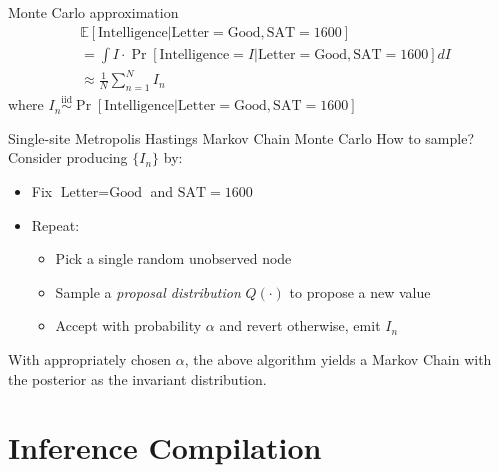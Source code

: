\documentclass{beamer}
\begin{document}
\begin{frame}[fragile]{Monte Carlo approximation}
\begin{align*}
    &\mathbb{E}[\text{Intelligence} | \text{Letter}=\text{Good}, \text{SAT}=1600] \\
    &= \int I \cdot \Pr[\text{Intelligence}=I | \text{Letter}=\text{Good}, \text{SAT}=1600] dI \\
    &\approx \frac{1}{N} \sum_{n=1}^N I_n
\end{align*}
where $I_n \overset{\text{iid}}{\sim} \Pr[\text{Intelligence} | \text{Letter}=\text{Good}, \text{SAT}=1600]$

\end{frame}

\begin{frame}[fragile]{Single-site Metropolis Hastings Markov Chain Monte Carlo}
    How to sample? Consider producing $\{I_n\}$ by:
    \begin{itemize}
        \item Fix $\text{Letter}=\text{Good}$ and $\text{SAT}=1600$
        \item Repeat:
        \begin{itemize}
            \item Pick a single random unobserved node
            \item Sample a \emph{proposal distribution} $Q(\cdot)$ to propose a new value
            \item Accept with probability $\alpha$ and revert otherwise, emit $I_n$
        \end{itemize}
    \end{itemize}
    
    \begin{theorem}
        With appropriately chosen $\alpha$, the above algorithm yields
        a Markov Chain with the posterior as the invariant distribution.
    \end{theorem}
\end{frame}

\section{Inference Compilation}
\end{document}
